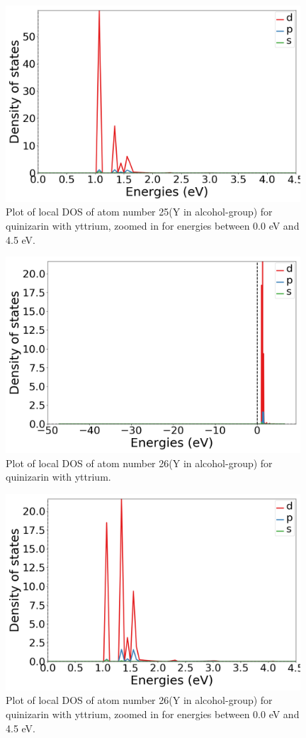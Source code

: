 \documentclass{article}
\begin{document}
  \begin{figure}[H]
      \centering
      \includegraphics[width = 11cm]{../fig/Y_k4_LDOS25_2.png}
      \caption{Plot of local DOS of atom number 25(Y in alcohol-group) for quinizarin with yttrium, zoomed in for energies between 0.0 eV and 4.5 eV. }
      \label{fig:Y_k4_LDOS25_2.png}
  \end{figure}

  \begin{figure}[H]
      \centering
      \includegraphics[width = 11cm]{../fig/Y_k4_LDOS26_1.png}
      \caption{Plot of local DOS of atom number 26(Y in alcohol-group) for quinizarin with yttrium. }
      \label{fig:Y_k4_LDOS26_1.png}
  \end{figure}

  \begin{figure}[H]
      \centering
      \includegraphics[width = 11cm]{../fig/Y_k4_LDOS26_2.png}
      \caption{Plot of local DOS of atom number 26(Y in alcohol-group) for quinizarin with yttrium, zoomed in for energies between 0.0 eV and 4.5 eV. }
      \label{fig:Y_k4_LDOS26_2.png}
  \end{figure}
\end{document}
